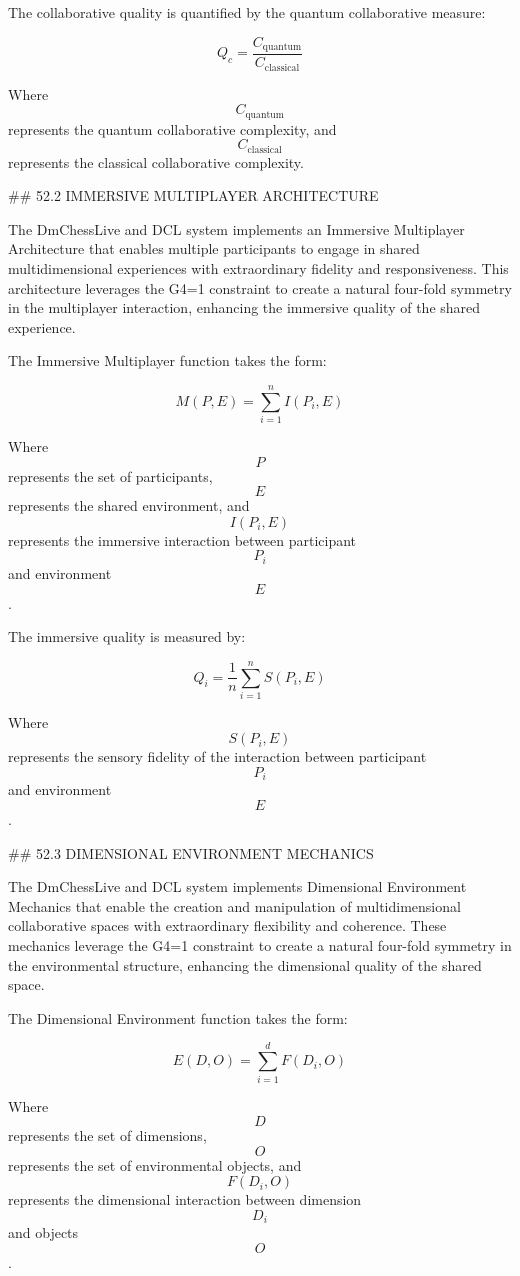 The collaborative quality is quantified by the quantum collaborative measure:

$$ Q_c = \frac{C_{\text{quantum}}}{C_{\text{classical}}} $$

Where $$ C_{\text{quantum}} $$ represents the quantum collaborative complexity, and $$ C_{\text{classical}} $$ represents the classical collaborative complexity.

## 52.2 IMMERSIVE MULTIPLAYER ARCHITECTURE

The DmChessLive and DCL system implements an Immersive Multiplayer Architecture that enables multiple participants to engage in shared multidimensional experiences with extraordinary fidelity and responsiveness. This architecture leverages the G4=1 constraint to create a natural four-fold symmetry in the multiplayer interaction, enhancing the immersive quality of the shared experience.

The Immersive Multiplayer function takes the form:

$$ M(P, E) = \sum_{i=1}^{n} I(P_i, E) $$

Where $$ P $$ represents the set of participants, $$ E $$ represents the shared environment, and $$ I(P_i, E) $$ represents the immersive interaction between participant $$ P_i $$ and environment $$ E $$.

The immersive quality is measured by:

$$ Q_i = \frac{1}{n} \sum_{i=1}^{n} S(P_i, E) $$

Where $$ S(P_i, E) $$ represents the sensory fidelity of the interaction between participant $$ P_i $$ and environment $$ E $$.

## 52.3 DIMENSIONAL ENVIRONMENT MECHANICS

The DmChessLive and DCL system implements Dimensional Environment Mechanics that enable the creation and manipulation of multidimensional collaborative spaces with extraordinary flexibility and coherence. These mechanics leverage the G4=1 constraint to create a natural four-fold symmetry in the environmental structure, enhancing the dimensional quality of the shared space.

The Dimensional Environment function takes the form:

$$ E(D, O) = \sum_{i=1}^{d} F(D_i, O) $$

Where $$ D $$ represents the set of dimensions, $$ O $$ represents the set of environmental objects, and $$ F(D_i, O) $$ represents the dimensional interaction between dimension $$ D_i $$ and objects $$ O $$.

